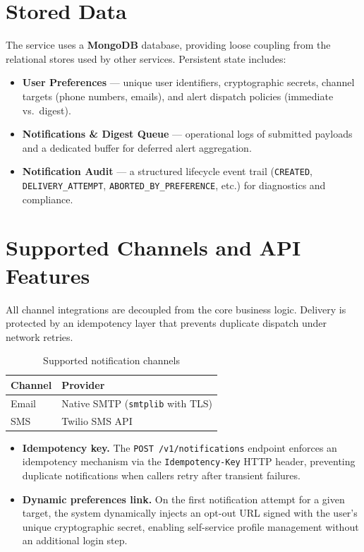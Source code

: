 \documentclass[12pt,a4paper,oneside]{report}
\begin{document}
\section{Stored Data}
The service uses a \textbf{MongoDB} database, providing loose coupling from the relational stores used by other services. Persistent state includes:

\begin{itemize}
    \item \textbf{User Preferences} — unique user identifiers, cryptographic secrets, channel targets (phone numbers, emails), and alert dispatch policies (immediate vs.\ digest).
    \item \textbf{Notifications \& Digest Queue} — operational logs of submitted payloads and a dedicated buffer for deferred alert aggregation.
    \item \textbf{Notification Audit} — a structured lifecycle event trail (\texttt{CREATED}, \texttt{DELIVERY\_ATTEMPT}, \texttt{ABORTED\_BY\_PREFERENCE}, etc.) for diagnostics and compliance.
\end{itemize}

\section{Supported Channels and API Features}
All channel integrations are decoupled from the core business logic. Delivery is protected by an idempotency layer that prevents duplicate dispatch under network retries.

\begin{table}[H]
\centering
\caption{Supported notification channels}
\label{tab:supported_channels}
\begin{tabular}{l l}
\toprule
\textbf{Channel} & \textbf{Provider} \\
\midrule
Email            & Native SMTP (\texttt{smtplib} with TLS) \\
SMS              & Twilio SMS API \\
\bottomrule
\end{tabular}
\end{table}

\begin{itemize}
    \item \textbf{Idempotency key.} The \texttt{POST /v1/notifications} endpoint enforces an idempotency mechanism via the \texttt{Idempotency-Key} HTTP header, preventing duplicate notifications when callers retry after transient failures.
    \item \textbf{Dynamic preferences link.} On the first notification attempt for a given target, the system dynamically injects an opt-out URL signed with the user's unique cryptographic secret, enabling self-service profile management without an additional login step.
\end{itemize}
\end{document}
